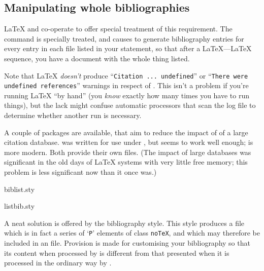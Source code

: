 \subsection{Manipulating whole bibliographies}


\LaTeX{} and \BibTeX{} co-operate to offer special treatment of this
requirement.  The command  is specially treated,
and causes \BibTeX{} to generate bibliography entries for every entry
in each  file listed in your  statement, so
that after a \LaTeX{}--\BibTeX{}--\LaTeX{} sequence, you have a
document with the whole thing listed.

Note that \LaTeX{} \emph{doesn't} produce
``\texttt{Citation ... undefined}'' or
``\texttt{There were undefined references}'' warnings in respect of
.  This isn't a problem if you're running
\LaTeX{} ``by hand'' (you \emph{know} exactly how many times you have
to run things), but the lack might confuse automatic processors that
scan the log file to determine whether another run is necessary.

A couple of packages are available, that aim to reduce the impact of
 of a large citation database.  
was written for use under \LaTeXo{}, but seems to work well enough;
 is more modern.  Both provide their own
 files.  (The impact of large databases was significant
in the old days of \LaTeX{} systems with very little free memory; this
problem is less significant now than it once was.)
\begin{ctanrefs}
\item[biblist.sty]
\item[listbib.sty]
\end{ctanrefs}


A neat solution is offered by the  bibliography style.
This style produces a  file which is in fact a series of
 `\texttt{P}' elements of class \texttt{noTeX}, and which
may therefore be included in an  file.  Provision is made
for customising your bibliography so that its content when processed by
 is different from that presented when it is processed
in the ordinary way by \AllTeX{}.

